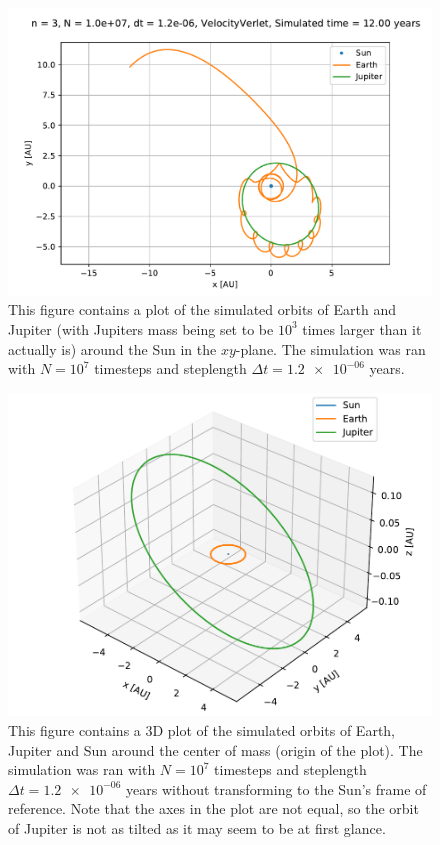 \documentclass[reprint,english,notitlepage]{revtex4-1}  %
\begin{document}
\begin{figure}[H]
\includegraphics[width=\columnwidth]{../data/figures/sun-earth-jupiter/sej_1000xM_vv_orbit2D.pdf}
\caption{This figure contains a plot of the simulated orbits of Earth and Jupiter (with Jupiters mass being set to be $10^3$ times larger than it actually is) around the Sun in the $xy$-plane. The simulation was ran with $N=10^7$ timesteps and steplength $\Delta t = \num{1.2e-06}$ years.}
\label{fig:sej-1000}
\end{figure}

\begin{figure}[H]
\includegraphics[width=\columnwidth]{../data/figures/sun-earth-jupiter/sej_1xM_vv_orbit3D_COM.pdf}
\caption{This figure contains a 3D plot of the simulated orbits of Earth, Jupiter and Sun around the center of mass (origin of the plot). The simulation was ran with $N=10^7$ timesteps and steplength $\Delta t = \num{1.2e-06}$ years without transforming to the Sun's frame of reference. Note that the axes in the plot are not equal, so the orbit of Jupiter is not as tilted as it may seem to be at first glance.}
\label{fig:sej-standard-COM}
\end{figure}
\end{document}
